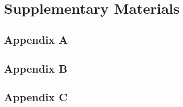 \documentclass[11pt, a4paper, titles]{report}  %
\begin{document}

\setcounter{secnumdepth}{-2}%


\cleardoublepage
{}
{}
\chapter*{\huge\centering Supplementary Materials}  
\section{Appendix A}
%
\newpage
\section{Appendix B}
%
\newpage
\section{Appendix C}

\end{document}
